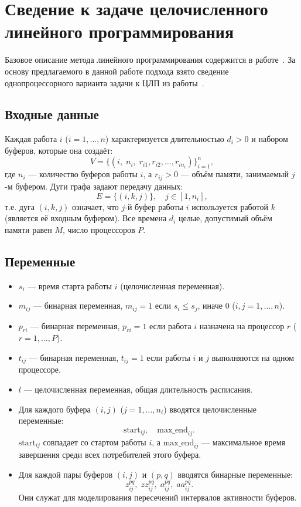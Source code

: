\section{Сведение к задаче целочисленного линейного программирования}
\label{sec:4_reduce_description}

Базовое описание метода линейного программирования содержится в работе~\cite{ShevchenkoZolotykh2004}. За основу предлагаемого в данной работе подхода взято сведение однопроцессорного варианта задачи к ЦЛП из работы~\cite{Senyushkina2025}.

\subsection*{Входные данные}
Каждая работа $i$ ($i=1,\dots,n$) характеризуется длительностью $d_i>0$ и набором буферов, которые она создаёт:
\[
V = \bigl\{(i,\; n_i,\; r_{i1}, r_{i2}, \dots, r_{i n_i})\bigr\}_{i=1}^{n},
\]
где $n_i$ — количество буферов работы $i$, а $r_{ij}>0$ — объём памяти, занимаемый $j$-м буфером.  
Дуги графа задают передачу данных:
\[
E = \{(i, k, j)\},\quad j\in[1,n_i],
\]
т.е. дуга $(i,k,j)$ означает, что $j$-й буфер работы $i$ используется работой $k$ (является её входным буфером).  
Все времена $d_i$ целые, допустимый объём памяти равен $M$, число процессоров $P$.

\subsection*{Переменные}

\begin{itemize}
	\item $s_i$ — время старта работы $i$ (целочисленная переменная).
	\item $m_{ij}$ — бинарная переменная, $m_{ij}=1$ если $s_i \le s_j$, иначе $0$ ($i,j=1,\dots,n$).
	\item $p_{ri}$ — бинарная переменная, $p_{ri}=1$ если работа $i$ назначена на процессор $r$ ($r=1,\dots,P$).
	\item $t_{ij}$ — бинарная переменная, $t_{ij}=1$ если работы $i$ и $j$ выполняются на одном процессоре.
	\item $l$ — целочисленная переменная, общая длительность расписания.
	\item Для каждого буфера $(i,j)$ ($j=1,\dots,n_i$) вводятся целочисленные переменные:
	\[
	\text{start}_{ij},\quad \text{max\_end}_{ij}.
	\]
	$\text{start}_{ij}$ совпадает со стартом работы $i$, а $\text{max\_end}_{ij}$ — максимальное время завершения среди всех потребителей этого буфера.
	\item Для каждой пары буферов $(i,j)$ и $(p,q)$ вводятся бинарные переменные:
	\[
	z_{ij}^{pq},\; zz_{ij}^{pq},\; a_{ij}^{pq},\; aa_{ij}^{pq}.
	\]
	Они служат для моделирования пересечений интервалов активности буферов.
\end{itemize}

